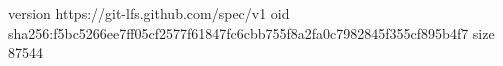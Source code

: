 version https://git-lfs.github.com/spec/v1
oid sha256:f5bc5266ee7ff05cf2577f61847fc6cbb755f8a2fa0c7982845f355cf895b4f7
size 87544
